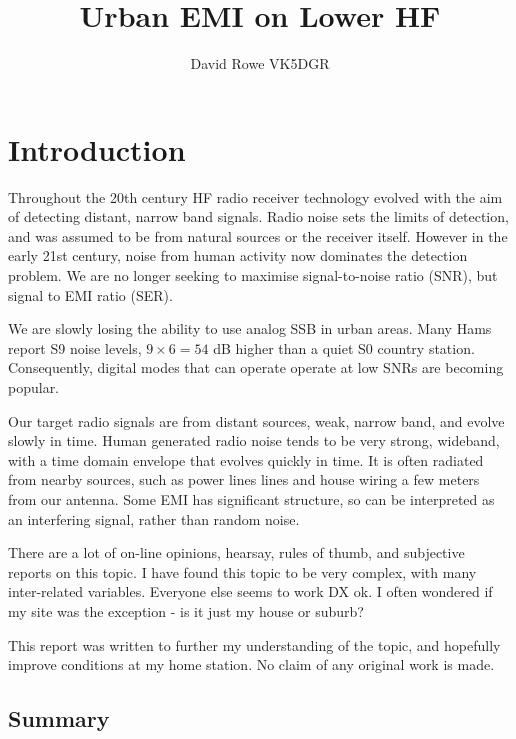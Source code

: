 \documentclass{article}
\begin{document}
\title{Urban EMI on Lower HF}
\author{David Rowe VK5DGR}

\maketitle

\section{Introduction}
 
Throughout the 20th century HF radio receiver technology evolved with the aim of detecting distant, narrow band signals.  Radio noise sets the limits of detection, and was assumed to be from natural sources or the receiver itself.  However in the early 21st century, noise from human activity now dominates the detection problem.  We are no longer seeking to maximise signal-to-noise ratio (SNR), but signal to EMI ratio (SER).

We are slowly losing the ability to use analog SSB in urban areas.  Many Hams report S9 noise levels, $9 \times 6 = 54$ dB higher than a quiet S0 country station.  Consequently, digital modes that can operate operate at low SNRs are becoming popular.

Our target radio signals are from distant sources, weak, narrow band, and evolve slowly in time. Human generated radio noise tends to be very strong, wideband, with a time domain envelope that evolves quickly in time.  It is often radiated from nearby sources, such as power lines lines and house wiring a few meters from our antenna.  Some EMI has significant structure, so can be interpreted as an interfering signal, rather than random noise.

There are a lot of on-line opinions, hearsay, rules of thumb, and subjective reports on this topic.  I have found this topic to be very complex, with many inter-related variables. Everyone else seems to work DX ok. I often wondered if my site was the exception - is it just my house or suburb?  

This report was written to further my understanding of the topic, and hopefully improve conditions at my home station. No claim of any original work is made.

\subsection{Summary}
\end{document}
